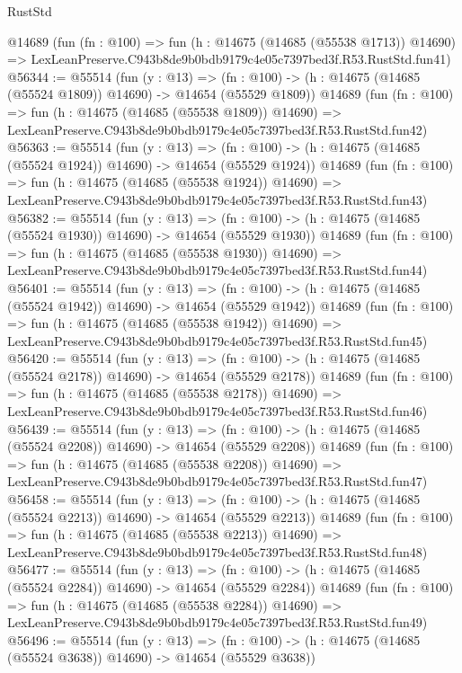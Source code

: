 \begin{lexlean}{RustStd}
\begin{coremodule}
    @14689
    (fun (fn : @100) =>
    fun (h : @14675 (@14685 (@55538 @1713)) @14690) =>
    LexLeanPreserve.C943b8de9b0bdb9179c4e05c7397bed3f.R53.RustStd.fun41)
@56344 := @55514
    (fun (y : @13) =>
    (fn : @100) -> (h : @14675 (@14685 (@55524 @1809)) @14690) -> @14654 (@55529 @1809))
    @14689
    (fun (fn : @100) =>
    fun (h : @14675 (@14685 (@55538 @1809)) @14690) =>
    LexLeanPreserve.C943b8de9b0bdb9179c4e05c7397bed3f.R53.RustStd.fun42)
@56363 := @55514
    (fun (y : @13) =>
    (fn : @100) -> (h : @14675 (@14685 (@55524 @1924)) @14690) -> @14654 (@55529 @1924))
    @14689
    (fun (fn : @100) =>
    fun (h : @14675 (@14685 (@55538 @1924)) @14690) =>
    LexLeanPreserve.C943b8de9b0bdb9179c4e05c7397bed3f.R53.RustStd.fun43)
@56382 := @55514
    (fun (y : @13) =>
    (fn : @100) -> (h : @14675 (@14685 (@55524 @1930)) @14690) -> @14654 (@55529 @1930))
    @14689
    (fun (fn : @100) =>
    fun (h : @14675 (@14685 (@55538 @1930)) @14690) =>
    LexLeanPreserve.C943b8de9b0bdb9179c4e05c7397bed3f.R53.RustStd.fun44)
@56401 := @55514
    (fun (y : @13) =>
    (fn : @100) -> (h : @14675 (@14685 (@55524 @1942)) @14690) -> @14654 (@55529 @1942))
    @14689
    (fun (fn : @100) =>
    fun (h : @14675 (@14685 (@55538 @1942)) @14690) =>
    LexLeanPreserve.C943b8de9b0bdb9179c4e05c7397bed3f.R53.RustStd.fun45)
@56420 := @55514
    (fun (y : @13) =>
    (fn : @100) -> (h : @14675 (@14685 (@55524 @2178)) @14690) -> @14654 (@55529 @2178))
    @14689
    (fun (fn : @100) =>
    fun (h : @14675 (@14685 (@55538 @2178)) @14690) =>
    LexLeanPreserve.C943b8de9b0bdb9179c4e05c7397bed3f.R53.RustStd.fun46)
@56439 := @55514
    (fun (y : @13) =>
    (fn : @100) -> (h : @14675 (@14685 (@55524 @2208)) @14690) -> @14654 (@55529 @2208))
    @14689
    (fun (fn : @100) =>
    fun (h : @14675 (@14685 (@55538 @2208)) @14690) =>
    LexLeanPreserve.C943b8de9b0bdb9179c4e05c7397bed3f.R53.RustStd.fun47)
@56458 := @55514
    (fun (y : @13) =>
    (fn : @100) -> (h : @14675 (@14685 (@55524 @2213)) @14690) -> @14654 (@55529 @2213))
    @14689
    (fun (fn : @100) =>
    fun (h : @14675 (@14685 (@55538 @2213)) @14690) =>
    LexLeanPreserve.C943b8de9b0bdb9179c4e05c7397bed3f.R53.RustStd.fun48)
@56477 := @55514
    (fun (y : @13) =>
    (fn : @100) -> (h : @14675 (@14685 (@55524 @2284)) @14690) -> @14654 (@55529 @2284))
    @14689
    (fun (fn : @100) =>
    fun (h : @14675 (@14685 (@55538 @2284)) @14690) =>
    LexLeanPreserve.C943b8de9b0bdb9179c4e05c7397bed3f.R53.RustStd.fun49)
@56496 := @55514
    (fun (y : @13) =>
    (fn : @100) -> (h : @14675 (@14685 (@55524 @3638)) @14690) -> @14654 (@55529 @3638))

\end{coremodule}
\end{lexlean}
